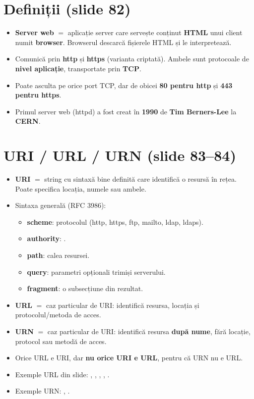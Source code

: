 \documentclass[11pt,a4paper]{article}
\begin{document}

\section{Definiții (slide 82)}
\begin{itemize}
  \item \textbf{Server web} $=$ aplicație server care servește conținut \textbf{HTML} unui client numit \textbf{browser}. Browserul descarcă fișierele HTML și le interpretează.
  \item Comunică prin \textbf{http} și \textbf{https} (varianta criptată). Ambele sunt protocoale de \textbf{nivel aplicație}, transportate prin \textbf{TCP}.
  \item Poate asculta pe orice port TCP, dar de obicei \textbf{80 pentru http} și \textbf{443 pentru https}.
  \item Primul server web (httpd) a fost creat în \textbf{1990} de \textbf{Tim Berners-Lee} la \textbf{CERN}.
\end{itemize}

\section{URI / URL / URN (slide 83--84)}
\begin{itemize}
  \item \textbf{URI} $=$ string cu sintaxă bine definită care identifică o resursă în rețea. Poate specifica locația, numele sau ambele.
  \item Sintaxa generală (RFC 3986): 
  \begin{itemize}
    \item \textbf{scheme}: protocolul (http, https, ftp, mailto, ldap, ldaps).
    \item \textbf{authority}: .
    \item \textbf{path}: calea resursei.
    \item \textbf{query}: parametri opționali trimiși serverului.
    \item \textbf{fragment}: o subsecțiune din rezultat.
  \end{itemize}
  \item \textbf{URL} $=$ caz particular de URI: identifică resursa, locația și protocolul/metoda de acces.
  \item \textbf{URN} $=$ caz particular de URI: identifică resursa \textbf{după nume}, fără locație, protocol sau metodă de acces.
  \item Orice URL e URI, dar \textbf{nu orice URI e URL}, pentru că URN nu e URL.
  \item Exemple URL din slide: , , , , .
  \item Exemple URN: , .
\end{itemize}
\end{document}
